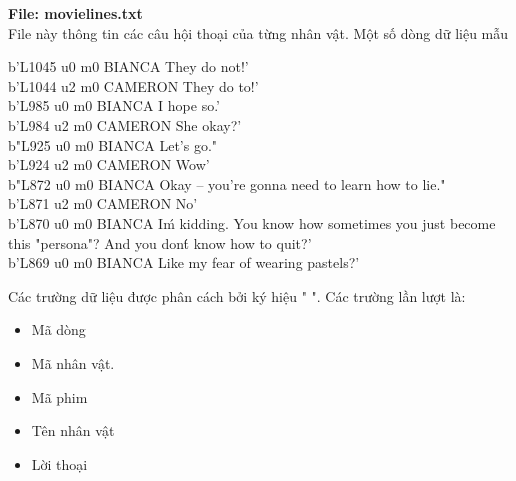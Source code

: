 \textbf{File: movie\detokenize{_}lines.txt} \\
File này thông tin các câu hội thoại của từng nhân vật. Một số dòng dữ liệu mẫu
\begin{displayquote}
b'L1045 \detokenize{+++$+++} u0 \detokenize{+++$+++} m0 \detokenize{+++$+++} BIANCA \detokenize{+++$+++} They do not!\n' \\
b'L1044 \detokenize{+++$+++}  u2 \detokenize{+++$+++}  m0 \detokenize{+++$+++}  CAMERON \detokenize{+++$+++}  They do to!\n' \\
b'L985 \detokenize{+++$+++}  u0 \detokenize{+++$+++}  m0 \detokenize{+++$+++}  BIANCA \detokenize{+++$+++}  I hope so.\n' \\
b'L984 \detokenize{+++$+++}  u2 \detokenize{+++$+++}  m0 \detokenize{+++$+++}  CAMERON \detokenize{+++$+++}  She okay?\n' \\
b"L925 \detokenize{+++$+++}  u0 \detokenize{+++$+++}  m0 \detokenize{+++$+++}  BIANCA \detokenize{+++$+++}  Let's go.\n" \\
b'L924 \detokenize{+++$+++}  u2 \detokenize{+++$+++}  m0 \detokenize{+++$+++}  CAMERON \detokenize{+++$+++}  Wow\n' \\
b"L872 \detokenize{+++$+++}  u0 \detokenize{+++$+++}  m0 \detokenize{+++$+++}  BIANCA \detokenize{+++$+++}  Okay -- you're gonna need to learn how to lie.\n" \\
b'L871 \detokenize{+++$+++}  u2 \detokenize{+++$+++}  m0 \detokenize{+++$+++}  CAMERON \detokenize{+++$+++}  No\n' \\
b'L870 \detokenize{+++$+++}  u0 \detokenize{+++$+++}  m0 \detokenize{+++$+++}  BIANCA \detokenize{+++$+++}  I\'m kidding.  You know how sometimes you just become this
"persona"?  And you don\'t know how to quit?\n' \\
b'L869 \detokenize{+++$+++}  u0 \detokenize{+++$+++}  m0 \detokenize{+++$+++}  BIANCA \detokenize{+++$+++}  Like my fear of wearing pastels?\n' \\
\end{displayquote}
Các trường dữ liệu được phân cách bởi ký hiệu "\detokenize{+++$+++} ".
Các trường lần lượt là:
\begin{itemize}
    \item Mã dòng
    \item Mã nhân vật.
    \item Mã phim
    \item Tên nhân vật
    \item Lời thoại
\end{itemize}

